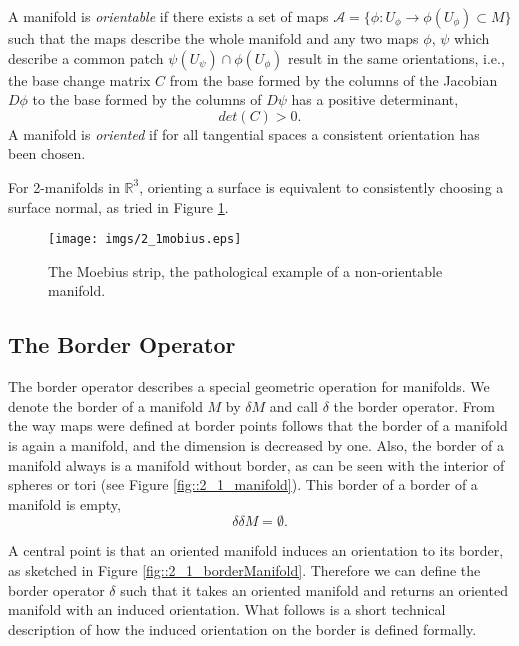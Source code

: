 \begin{definition} A manifold is \emph{orientable} if there exists a set of maps $\mathcal A = \{\phi: U_\phi \to \phi(U_\phi) \subset M\}$ such that the maps describe the whole manifold and any two maps $\phi$, $\psi$ which describe a common patch $\psi(U_\psi) \cap \phi(U_\phi)$ result in the same orientations, i.e., the base change matrix $C$ from the base formed by the columns of the Jacobian $D\phi$ to the base formed by the columns of $D\psi$ has a positive determinant,
\[det(C) >0.\]
A manifold is \emph{oriented} if for all tangential spaces a consistent orientation has been chosen.

\end{definition}

For 2-manifolds in $\mathbb R^3$, orienting a surface is equivalent to consistently choosing a surface normal, as tried in Figure \ref{fig::2_1_mobius}.

\begin{figure}[t]
\begin{center}
\texttt{[image: imgs/2\_1mobius.eps]}
\caption{The Moebius strip, the pathological example of a non-orientable manifold.}
\label{fig::2_1_mobius}
\end{center}
\end{figure}

\subsection{The Border Operator}
The border operator describes a special geometric operation for manifolds. 
We denote the border of a manifold $M$ by $\delta M$ and call $\delta$ the border operator. From the way maps were defined at border points follows that the border of a manifold is again a manifold, and the dimension is decreased by one. Also, the border of a manifold always is a manifold without border, as can be seen with the interior of spheres or tori (see Figure \ref{fig::2_1_manifold}). This border of a border of a manifold is empty,
\[\delta\delta M = \emptyset.\]

A central point  is that an oriented manifold induces an orientation to its border, as sketched in Figure \ref{fig::2_1_borderManifold}. Therefore we can define the border operator $\delta$ such that it takes an oriented manifold and returns an oriented manifold with an induced orientation.  What follows is a short technical description of how the induced orientation on the border is defined formally. 

